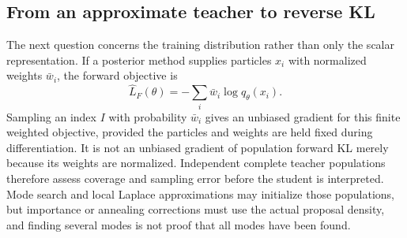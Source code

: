 \subsection{From an approximate teacher to reverse KL}

The next question concerns the training distribution rather than only the
scalar representation. If a posterior method supplies particles $x_i$ with
normalized weights $\bar w_i$, the forward objective is
\begin{equation}
 \widehat L_F(\theta)=-\sum_i\bar w_i\log q_\theta(x_i).
\end{equation}
Sampling an index $I$ with probability $\bar w_i$ gives an unbiased gradient
for this finite weighted objective, provided the particles and weights are
held fixed during differentiation. It is not an unbiased gradient of population
forward KL merely because its weights are normalized. Independent complete
teacher populations therefore assess coverage and sampling error before the
student is interpreted. Mode search and local Laplace approximations may
initialize those populations, but importance or annealing corrections must
use the actual proposal density, and finding several modes is not proof that
all modes have been found.

